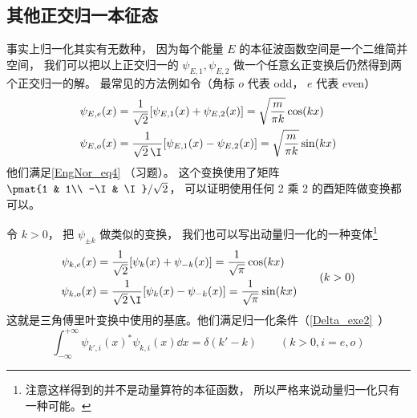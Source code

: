 \subsection{其他正交归一本征态}
事实上归一化其实有无数种， 因为每个能量 $E$ 的本征波函数空间是一个二维简并空间， 我们可以把以上正交归一的 $\psi_{E,1}, \psi_{E,2}$ 做一个任意幺正变换后仍然得到两个正交归一的解。 最常见的方法例如令（角标 $o$ 代表 odd， $e$ 代表 even）
\begin{equation}
\begin{aligned}
\psi_{E,e}(x) &= \frac{1}{\sqrt{2}}[\psi_{E,1}(x) + \psi_{E,2}(x)] = \sqrt{\frac{m}{\pi k}}\cos(kx)\\
\psi_{E,o}(x) &= \frac{1}{\sqrt{2}\,\I}[\psi_{E,1}(x) - \psi_{E,2}(x)] = \sqrt{\frac{m}{\pi k}}\sin(kx)
\end{aligned}
\end{equation}
他们满足\autoref{EngNor_eq4} （习题）。 这个变换使用了矩阵 $\pmat{1 & 1\\ -\I & \I}/\sqrt{2}$， 可以证明使用任何 2 乘 2 的酉矩阵做变换都可以。

令 $k > 0$， 把 $\psi_{\pm k}$ 做类似的变换， 我们也可以写出动量归一化的一种变体\footnote{注意这样得到的并不是动量算符的本征函数， 所以严格来说动量归一化只有一种可能。}
\begin{equation}\label{EngNor_eq5}
\begin{aligned}
\psi_{k,e}(x) &= \frac{1}{\sqrt{2}}[\psi_{k}(x) + \psi_{-k}(x)] = \frac{1}{\sqrt{\pi}}\cos(kx)\\
\psi_{k,o}(x) &= \frac{1}{\sqrt{2}\,\I}[\psi_{k}(x) - \psi_{-k}(x)] = \frac{1}{\sqrt{\pi}}\sin(kx)
\end{aligned}
\qquad (k > 0)
\end{equation}
这就是三角傅里叶变换中使用的基底。他们满足归一化条件（\autoref{Delta_exe2}~）
\begin{equation}\label{EngNor_eq3}
\int_{-\infty}^{+\infty} \psi_{k',i}(x)^* \psi_{k,i}(x) \dd{x} = \delta(k' - k) \qquad (k > 0, i = e, o)
\end{equation}
